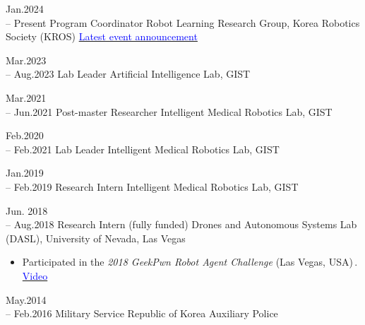 \documentclass[9pt]{developercv} %
\begin{document}
{\begin{entrylist}
\end{entrylist}

\begin{entrylist}
    \entry
      {Jan.2024 \\-- Present}
      {Program Coordinator}
      {Robot Learning Research Group, Korea Robotics Society (KROS)}
    {%
        \href{https://kros.org/Conference/ConferenceView.asp?AC=3&CODE=CD20250401&B_CATE=BBC1}%
             {\textcolor{blue}{\faFileTextO\;Latest event announcement}}
      }

    \entry
      {Mar.2023 \\ -- Aug.2023}
      {Lab Leader}
      {Artificial Intelligence Lab, GIST}
      {}

    \entry
      {Mar.2021 \\ -- Jun.2021}
      {Post-master Researcher}
      {Intelligent Medical Robotics Lab, GIST}
      {}

    \entry
      {Feb.2020 \\-- Feb.2021}
      {Lab Leader}
      {Intelligent Medical Robotics Lab, GIST}
      {}
    
    \entry
      {Jan.2019 \\-- Feb.2019}
      {Research Intern}
      {Intelligent Medical Robotics Lab, GIST}
      {}
    
    \entry
      {Jun. 2018 \\ -- Aug.2018}
      {Research Intern (fully funded)}
      {Drones and Autonomous Systems Lab (DASL), University of Nevada, Las Vegas}
      {\vspace{-10pt}
    \begin{itemize}[leftmargin=*]
      \item Participated in the \textit{2018 GeekPwn Robot Agent Challenge} (Las Vegas, USA)\,. 
            \href{https://www.youtube.com/watch?v=SuOyI0M-0gk}%
            {\textcolor{blue}{\faVideoCamera\;Video}}
    \end{itemize}
      }

    \entry
      {May.2014 \\ -- Feb.2016}
      {Military Service}
      {Republic of Korea Auxiliary Police}
      {}


\end{entrylist}

}
\end{document}
